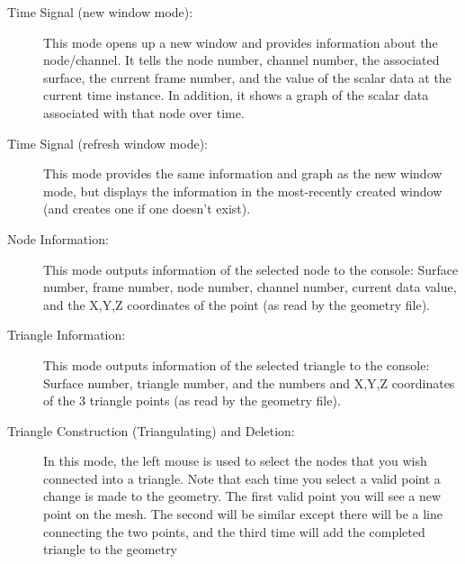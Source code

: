 

\begin{description}
  \item[Time Signal (new window mode): ] This mode opens up a new window
    and provides information about the node/channel.  It tells the node
    number, channel number, the associated surface, the current frame
    number, and the value of the scalar data at the current time instance.
    In addition, it shows a graph of the scalar data associated with that
    node over time.
    
  \item[Time Signal (refresh window mode): ] This mode provides the same
    information and graph as the new window mode, but displays the
    information in the most-recently created window (and creates one if one
    doesn't exist).
    
  \item[Node Information: ] This mode outputs information of the selected
    node to the console: Surface number, frame number, node number, channel
    number, current data value, and the X,Y,Z coordinates of the point (as
    read by the geometry file).
    
  \item[Triangle Information: ] This mode outputs information of the
    selected triangle to the console: Surface number, triangle number, and
    the numbers and X,Y,Z coordinates of the 3 triangle points (as read by
    the geometry file).

  \item[Triangle Construction (Triangulating) and Deletion: ]
    \label{sec:triangulate} 
    In this mode, the left mouse is used to select the nodes that you wish
    connected into a triangle.  Note that each time you select a valid
    point a change is made to the geometry.  The first valid point you will
    see a new point on the mesh.  The second will be similar except there
    will be a line connecting the two points, and the third time will add
    the completed triangle to the geometry


\end{description}
